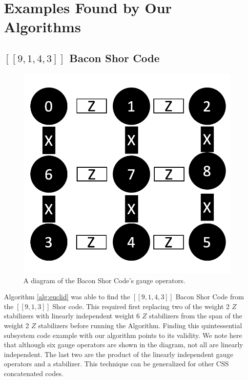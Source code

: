 \documentclass[conference]{IEEEtran}
\newcommand{\llbr}{[\![}
\newcommand{\rrbr}{]\!]}
\begin{document}
\section{Examples Found by Our Algorithms}


\subsection{$\llbr 9,1,4,3 \rrbr$ Bacon Shor Code}



\begin{figure}[ht]
 \includegraphics[scale=0.5]{baconshorcode.png}
\centering
\caption{A diagram of the Bacon Shor Code's gauge operators.}
\end{figure}


Algorithm \eqref{alg:euclid} was able to find the $\llbr 9,1,4,3 \rrbr $ Bacon Shor Code from the $ \llbr 9,1,3 \rrbr$ Shor code. This required first replacing two of the weight 2 $Z$ stabilizers with linearly independent weight 6 $Z$ stabilizers from the span of the weight 2 $Z$ stabilizers before running the Algorithm. Finding this quintessential subsystem code example with our algorithm points to its validity. We note here that although six gauge operators are shown in the diagram, not all are linearly independent. The last two are the product of the linearly independent gauge operators and a stabilizer. This technique can be generalized for other CSS concatenated codes. 
\end{document}
